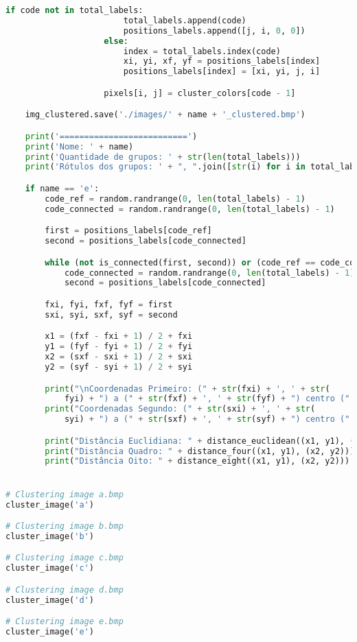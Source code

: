 \documentclass{article}
\begin{document}
\begin{lstlisting}[language=Python]
                    if code not in total_labels:
                        total_labels.append(code)
                        positions_labels.append([j, i, 0, 0])
                    else:
                        index = total_labels.index(code)
                        xi, yi, xf, yf = positions_labels[index]
                        positions_labels[index] = [xi, yi, j, i]

                    pixels[i, j] = cluster_colors[code - 1]

    img_clustered.save('./images/' + name + '_clustered.bmp')

    print('==========================')
    print('Nome: ' + name)
    print('Quantidade de grupos: ' + str(len(total_labels)))
    print('Rótulos dos grupos: ' + ", ".join([str(i) for i in total_labels]))

    if name == 'e':
        code_ref = random.randrange(0, len(total_labels) - 1)
        code_connected = random.randrange(0, len(total_labels) - 1)

        first = positions_labels[code_ref]
        second = positions_labels[code_connected]

        while (not is_connected(first, second)) or (code_ref == code_connected):
            code_connected = random.randrange(0, len(total_labels) - 1)
            second = positions_labels[code_connected]

        fxi, fyi, fxf, fyf = first
        sxi, syi, sxf, syf = second

        x1 = (fxf - fxi + 1) / 2 + fxi
        y1 = (fyf - fyi + 1) / 2 + fyi
        x2 = (sxf - sxi + 1) / 2 + sxi
        y2 = (syf - syi + 1) / 2 + syi

        print("\nCoordenadas Primeiro: (" + str(fxi) + ', ' + str(
            fyi) + ") a (" + str(fxf) + ', ' + str(fyf) + ") centro (" + str(x1) + ", " + str(y1) + ")")
        print("Coordenadas Segundo: (" + str(sxi) + ', ' + str(
            syi) + ") a (" + str(sxf) + ', ' + str(syf) + ") centro (" + str(x2) + ", " + str(y2) + ")")

        print("Distância Euclidiana: " + distance_euclidean((x1, y1), (x2, y2)))
        print("Distância Quadro: " + distance_four((x1, y1), (x2, y2)))
        print("Distância Oito: " + distance_eight((x1, y1), (x2, y2)))


# Clustering image a.bmp
cluster_image('a')

# Clustering image b.bmp
cluster_image('b')

# Clustering image c.bmp
cluster_image('c')

# Clustering image d.bmp
cluster_image('d')

# Clustering image e.bmp
cluster_image('e')
\end{lstlisting}
\end{document}
